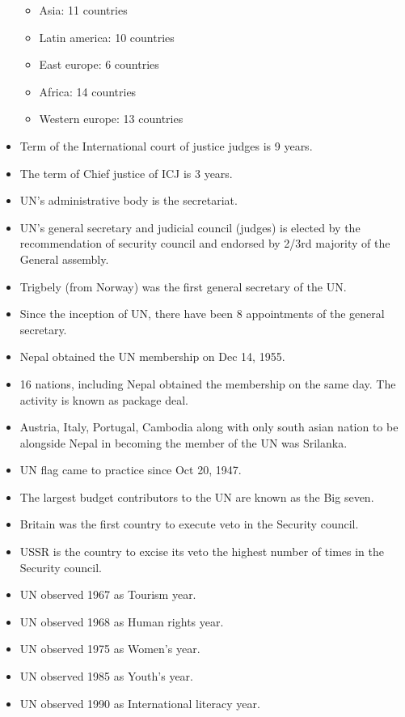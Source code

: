 \documentclass[
  openany]{book}
\providecommand{\tightlist}{%
  \setlength{\itemsep}{0pt}\setlength{\parskip}{0pt}}
\begin{document}
\begin{itemize}
  \begin{itemize}
  \tightlist
  \item
    Asia: 11 countries
  \item
    Latin america: 10 countries
  \item
    East europe: 6 countries
  \item
    Africa: 14 countries
  \item
    Western europe: 13 countries
  \end{itemize}
\item
  Term of the International court of justice judges is 9 years.
\item
  The term of Chief justice of ICJ is 3 years.
\item
  UN's administrative body is the secretariat.
\item
  UN's general secretary and judicial council (judges) is elected by the recommendation of security council and endorsed by 2/3rd majority of the General assembly.
\item
  Trigbely (from Norway) was the first general secretary of the UN.
\item
  Since the inception of UN, there have been 8 appointments of the general secretary.
\item
  Nepal obtained the UN membership on Dec 14, 1955.
\item
  16 nations, including Nepal obtained the membership on the same day. The activity is known as package deal.
\item
  Austria, Italy, Portugal, Cambodia along with only south asian nation to be alongside Nepal in becoming the member of the UN was Srilanka.
\item
  UN flag came to practice since Oct 20, 1947.
\item
  The largest budget contributors to the UN are known as the Big seven.
\item
  Britain was the first country to execute veto in the Security council.
\item
  USSR is the country to excise its veto the highest number of times in the Security council.
\item
  UN observed 1967 as Tourism year.
\item
  UN observed 1968 as Human rights year.
\item
  UN observed 1975 as Women's year.
\item
  UN observed 1985 as Youth's year.
\item
  UN observed 1990 as International literacy year.

\end{itemize}
\end{document}
